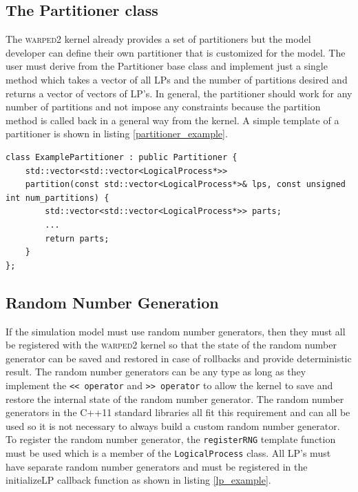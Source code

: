 \documentclass[11pt]{book}
\begin{document}
\subsection{The Partitioner class}\label{partitioner}

The \textsc{warped2} kernel already provides a set of partitioners but the model developer can define
their own partitioner that is customized for the model.  The user must derive from the Partitioner
base class and implement just a single method which takes a vector of all LPs and the number of
partitions desired and returns a vector of vectors of LP's.  In general, the partitioner should
work for any number of partitions and not impose any constraints because the partition method
is called back in a general way from the kernel.  A simple template of a partitioner is shown in
listing \ref{partitioner_example}.

\begin{lstlisting}[caption=Example \textsc{warped2} Partitioner Definition, label=partitioner_example, float]
class ExamplePartitioner : public Partitioner {
    std::vector<std::vector<LogicalProcess*>>
    partition(const std::vector<LogicalProcess*>& lps, const unsigned int num_partitions) {
        std::vector<std::vector<LogicalProcess*>> parts;
        ...
        return parts;
    }
};
\end{lstlisting}

\subsection{Random Number Generation}

If the simulation model must use random number generators, then they must all be registered
with the \textsc{warped2} kernel so that the state of the random number generator can be saved and
restored in case of rollbacks and provide deterministic result.  The random number generators
can be any type as long as they implement the \texttt{<< operator} and \texttt{>> operator} to
allow the kernel to save and restore the internal state of the random number generator.  The
random number generators in the C++11 standard libraries\cite{c++11-rng} all fit this requirement
and can all be used so it is not necessary to always build a custom random number generator.  To
register the random number generator, the \texttt{registerRNG} template function must be used which is
a member of the \texttt{LogicalProcess} class.  All LP's must have separate random number generators and
must be registered in the initializeLP callback function as shown in listing \ref{lp_example}.
\end{document}
